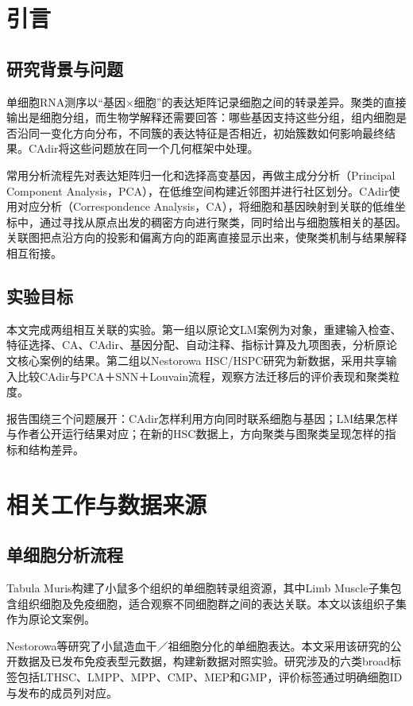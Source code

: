 \section{引言}
\subsection{研究背景与问题}
单细胞RNA测序以“基因×细胞”的表达矩阵记录细胞之间的转录差异。聚类的直接输出是细胞分组，而生物学解释还需要回答：哪些基因支持这些分组，组内细胞是否沿同一变化方向分布，不同簇的表达特征是否相近，初始簇数如何影响最终结果。CAdir将这些问题放在同一个几何框架中处理\cite{kohl2026}。

常用分析流程先对表达矩阵归一化和选择高变基因，再做主成分分析（Principal Component Analysis，PCA），在低维空间构建近邻图并进行社区划分。CAdir使用对应分析（Correspondence Analysis，CA），将细胞和基因映射到关联的低维坐标中，通过寻找从原点出发的稠密方向进行聚类，同时给出与细胞簇相关的基因。关联图把点沿方向的投影和偏离方向的距离直接显示出来，使聚类机制与结果解释相互衔接。

\subsection{实验目标}
本文完成两组相互关联的实验。第一组以原论文LM案例为对象，重建输入检查、特征选择、CA、CAdir、基因分配、自动注释、指标计算及九项图表，分析原论文核心案例的结果。第二组以Nestorowa HSC/HSPC研究为新数据，采用共享输入比较CAdir与PCA＋SNN＋Louvain流程，观察方法迁移后的评价表现和聚类粒度。

报告围绕三个问题展开：CAdir怎样利用方向同时联系细胞与基因；LM结果怎样与作者公开运行结果对应；在新的HSC数据上，方向聚类与图聚类呈现怎样的指标和结构差异。

\section{相关工作与数据来源}
\subsection{单细胞分析流程}
Tabula Muris构建了小鼠多个组织的单细胞转录组资源\cite{tabulamuris2018}，其中Limb Muscle子集包含组织细胞及免疫细胞，适合观察不同细胞群之间的表达关联。本文以该组织子集作为原论文案例。

Nestorowa等研究了小鼠造血干／祖细胞分化的单细胞表达\cite{nestorowa2016}。本文采用该研究的公开数据及已发布免疫表型元数据，构建新数据对照实验。研究涉及的六类broad标签包括LTHSC、LMPP、MPP、CMP、MEP和GMP，评价标签通过明确细胞ID与发布的成员列对应。

